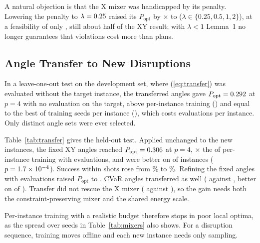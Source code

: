 \documentclass[conference]{IEEEtran}
\begin{document}
A natural objection is that the X mixer was handicapped by its penalty. Lowering the penalty to $\lambda=0.25$ raised its $P_{\mathrm{opt}}$ by \PenGain$\times$ to \PenBestPopt{} ($\lambda\in\{0.25,0.5,1,2\}$), at a feasibility of only \PenBestFeas, still about half of the XY result; with $\lambda<1$ Lemma~1 no longer guarantees that violations cost more than plans.

\subsection{Angle Transfer to New Disruptions}
In a leave-one-out test on the development set, where (\ref{eq:transfer}) was evaluated without the target instance, the transferred angles gave $P_{\mathrm{opt}}=0.292$ at $p=4$ with no evaluation on the target, above per-instance training (\LooTrainedFour) and equal to the best of \NSeeds{} training seeds per instance (\BestFiveFour), which costs \BestFiveEvals{} evaluations per instance. Only \LooNDonors{} distinct angle sets were ever selected.

Table~\ref{tab:transfer} gives the held-out test. Applied unchanged to the \HoN{} new instances, the fixed XY angles reached $P_{\mathrm{opt}}=0.306$ at $p=4$, \HoRatioFour$\times$ the \HoTrainedFour{} of per-instance training with \HoCumFour{} evaluations, and were better on \HoWinsFour{} of \HoN{} instances ($p=1.7\times10^{-4}$). Success within \Shots{} shots rose from \HoSuccTrained\% to \HoSuccFixed\%. Refining the fixed angles with \HoFt{} evaluations raised $P_{\mathrm{opt}}$ to \HoFtFour. CVaR angles transferred as well (\HoCvarFixed{} against \HoCvarTrained, better on \HoCvarWins{} of \HoN). Transfer did not rescue the X mixer (\HoXFixed{} against \HoXTrained), so the gain needs both the constraint-preserving mixer and the shared energy scale.

Per-instance training with a realistic budget therefore stops in poor local optima, as the spread over seeds in Table~\ref{tab:mixers} also shows. For a disruption sequence, training moves offline and each new instance needs only sampling.
\end{document}
